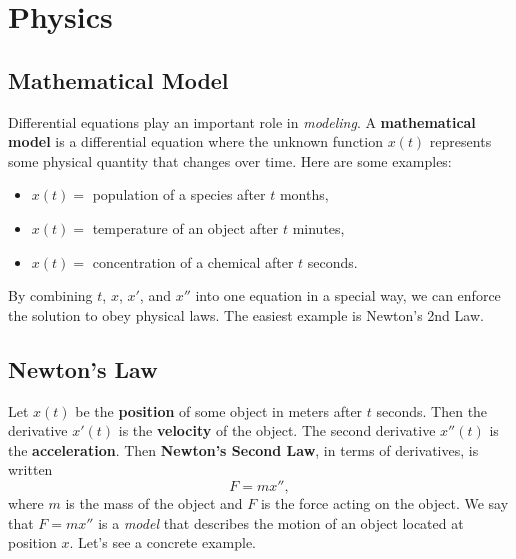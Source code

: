 \documentclass[11pt,letterpaper]{article}
\begin{document}


\section{Physics}

\subsection{Mathematical Model}

Differential equations play an important role in \textit{modeling}. A \textbf{mathematical model} is a differential equation where the unknown function $x(t)$ represents some physical quantity that changes over time. Here are some examples:
\begin{itemize}
    \item $x(t)=$ population of a species after $t$ months,
    \item $x(t)=$ temperature of an object after $t$ minutes,
    \item $x(t)=$ concentration of a chemical after $t$ seconds.
\end{itemize}
By combining $t$, $x$, $x'$, and $x''$ into one equation in a special way, we can enforce the solution to obey physical laws. The easiest example is Newton's 2nd Law.

\subsection{Newton's Law}
Let $x(t)$ be the \textbf{position} of some object in meters after $t$ seconds. Then the derivative $x'(t)$ is the \textbf{velocity} of the object. The second derivative $x''(t)$ is the \textbf{acceleration}. Then \textbf{Newton's Second Law}, in terms of derivatives, is written 
\[
F =mx'',
\]
where $m$ is the mass of the object and $F$ is the force acting on the object. We say that $F=mx''$ is a \textit{model} that describes the motion of an object located at position $x$. Let's see a concrete example.
\end{document}
